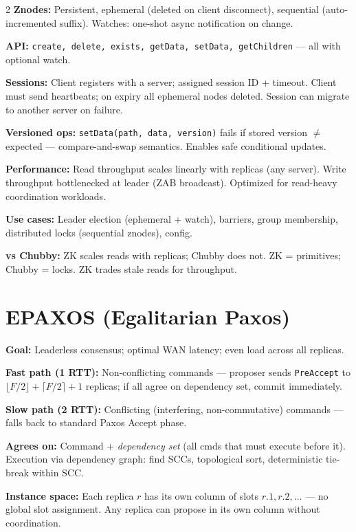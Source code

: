 \documentclass[9pt]{article}
\begin{document}
\begin{multicols*}{2}
\textbf{Znodes:} Persistent, ephemeral (deleted on client disconnect), sequential (auto-incremented suffix). Watches: one-shot async notification on change.

\textbf{API:} \texttt{create, delete, exists, getData, setData, getChildren} — all with optional watch.

\textbf{Sessions:} Client registers with a server; assigned session ID + timeout. Client must send heartbeats; on expiry all ephemeral nodes deleted. Session can migrate to another server on failure.

\textbf{Versioned ops:} \texttt{setData(path, data, version)} fails if stored version $\ne$ expected — compare-and-swap semantics. Enables safe conditional updates.

\textbf{Performance:} Read throughput scales linearly with replicas (any server). Write throughput bottlenecked at leader (ZAB broadcast). Optimized for read-heavy coordination workloads.

\textbf{Use cases:} Leader election (ephemeral + watch), barriers, group membership, distributed locks (sequential znodes), config.

\textbf{vs Chubby:} ZK scales reads with replicas; Chubby does not. ZK = primitives; Chubby = locks. ZK trades stale reads for throughput.

\section*{EPAXOS (Egalitarian Paxos)}

\textbf{Goal:} Leaderless consensus; optimal WAN latency; even load across all replicas.

\textbf{Fast path (1 RTT):} Non-conflicting commands — proposer sends \texttt{PreAccept} to $\lfloor F/2\rfloor + \lceil F/2\rceil + 1$ replicas; if all agree on dependency set, commit immediately.

\textbf{Slow path (2 RTT):} Conflicting (interfering, non-commutative) commands — falls back to standard Paxos Accept phase.

\textbf{Agrees on:} Command + \emph{dependency set} (all cmds that must execute before it). Execution via dependency graph: find SCCs, topological sort, deterministic tie-break within SCC.

\textbf{Instance space:} Each replica $r$ has its own column of slots $r.1, r.2,\ldots$ — no global slot assignment. Any replica can propose in its own column without coordination.


\end{multicols*}
\end{document}
